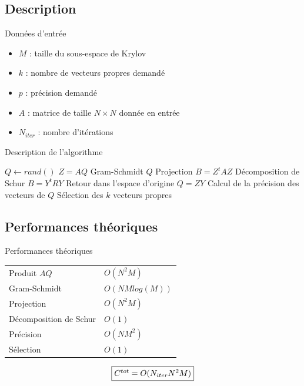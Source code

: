 \documentclass[9.5pt]{beamer}
\begin{document}
	\subsection{Description}
		\begin{frame}{Données d'entrée}
			\begin{itemize}
				\item $M$ : taille du sous-espace de Krylov
				\item $k$ : nombre de vecteurs propres demandé
				\item $p$ : précision demandé
				\item $A$ : matrice de taille $N\times N$ donnée en entrée
				\item $N_{iter}$ : nombre d'itérations
			\end{itemize}
		\end{frame}
		\begin{frame}{Description de l'algorithme}
			\begin{algorithmic}
				\State $Q \gets rand()$
					\State $Z = AQ$
					\State Gram-Schmidt $Q$
					\State Projection $B = Z^tAZ$
					\State Décomposition de Schur $B = Y^tRY$
					\State Retour dans l'espace d'origine $Q = ZY$
					\State Calcul de la précision des vecteurs de $Q$
					\State Sélection des $k$ vecteurs propres
				\EndWhile
			\end{algorithmic}
		\end{frame}

	\subsection{Performances théoriques}
		\begin{frame}{Performances théoriques}
			\begin{tabular}{ l l }
				Produit $AQ$ & $O(N^2M)$ \\
				Gram-Schmidt & $O(NMlog(M))$ \\
				Projection & $O(N^2M)$ \\
				Décomposition de Schur & $O(1)$ \\
				Précision & $O(NM^2)$ \\
				Sélection & $O(1)$ \\
			\end{tabular}

			
			$$
			\fbox{$C^{tot} = O(N_{iter}N^2M)$}
			$$
		\end{frame}
\end{document}
